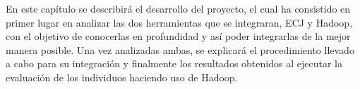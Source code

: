 En este cap\'itulo se describir\'a el desarrollo del proyecto, el cual ha consistido en primer lugar en analizar las dos herramientas que se integraran, ECJ y Hadoop, con el objetivo de conocerlas en profundidad y as\'i poder integrarlas de la mejor manera posible. Una vez analizadas ambas, se explicar\'a el procedimiento llevado a cabo para su integración y finalmente los resultados obtenidos al ejecutar la evaluación de los individuos haciendo uso de Hadoop.